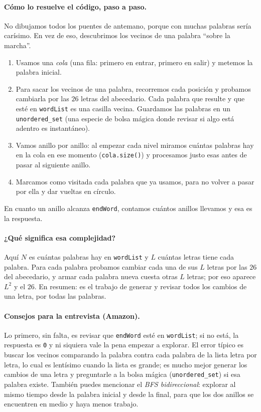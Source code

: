 \paragraph{Cómo lo resuelve el código, paso a paso.} No dibujamos todos los
puentes de antemano, porque con muchas palabras sería carísimo. En vez de eso,
descubrimos los vecinos de una palabra ``sobre la marcha''.
\begin{enumerate}
  \item Usamos una \emph{cola} (una fila: primero en entrar, primero en salir)
        y metemos la palabra inicial.
  \item Para sacar los vecinos de una palabra, recorremos cada posición y
        probamos cambiarla por las $26$ letras del abecedario. Cada palabra que
        resulte y que esté en \texttt{wordList} es una casilla vecina. Guardamos
        las palabras en un \texttt{unordered\_set} (una especie de bolsa mágica
        donde revisar si algo está adentro es instantáneo).
  \item Vamos anillo por anillo: al empezar cada nivel miramos cuántas palabras
        hay en la cola en ese momento (\texttt{cola.size()}) y procesamos justo
        esas antes de pasar al siguiente anillo.
  \item Marcamos como visitada cada palabra que ya usamos, para no volver a
        pasar por ella y dar vueltas en círculo.
\end{enumerate}
En cuanto un anillo alcanza \texttt{endWord}, contamos cuántos anillos llevamos
y esa es la respuesta.




\paragraph{¿Qué significa esa complejidad?} Aquí $N$ es cuántas palabras hay en
\texttt{wordList} y $L$ cuántas letras tiene cada palabra. Para cada palabra
probamos cambiar cada una de sus $L$ letras por las $26$ del abecedario, y armar
cada palabra nueva cuesta otras $L$ letras; por eso aparece $L^2$ y el $26$.
En resumen: es el trabajo de generar y revisar todos los cambios de una letra,
por todas las palabras.

\paragraph{Consejos para la entrevista (Amazon).} Lo primero, sin falta, es
revisar que \texttt{endWord} esté en \texttt{wordList}; si no está, la respuesta
es \texttt{0} y ni siquiera vale la pena empezar a explorar. El error típico es
buscar los vecinos comparando la palabra contra cada palabra de la lista letra
por letra, lo cual es lentísimo cuando la lista es grande; es mucho mejor
generar los cambios de una letra y preguntarle a la bolsa mágica
(\texttt{unordered\_set}) si esa palabra existe. También puedes mencionar el
\emph{BFS bidireccional}: explorar al mismo tiempo desde la palabra inicial y
desde la final, para que los dos anillos se encuentren en medio y haya menos
trabajo.
